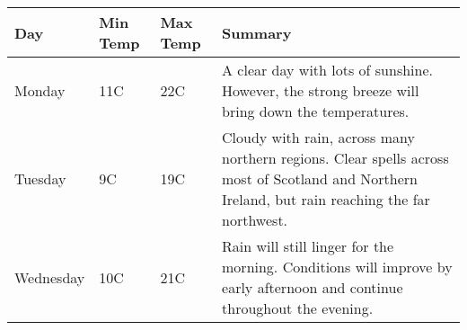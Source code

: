 \documentclass{article}
\begin{document}
\begin{center}
    \begin{tabular}{ | m{2cm} | b{1cm} | l | p{5cm} |}
    \hline
    Day & Min Temp & Max Temp & Summary \\ \hline
    Monday & 11C & 22C & A clear day with lots of sunshine.  
    However, the strong breeze will bring down the temperatures. \\ \hline
    Tuesday & 9C & 19C & Cloudy with rain, across many northern regions. Clear spells 
    across most of Scotland and Northern Ireland, 
    but rain reaching the far northwest. \\ \hline
    Wednesday & 10C & 21C & Rain will still linger for the morning. 
    Conditions will improve by early afternoon and continue 
    throughout the evening. \\
    \hline
    \end{tabular}
\end{center}
\end{document}

